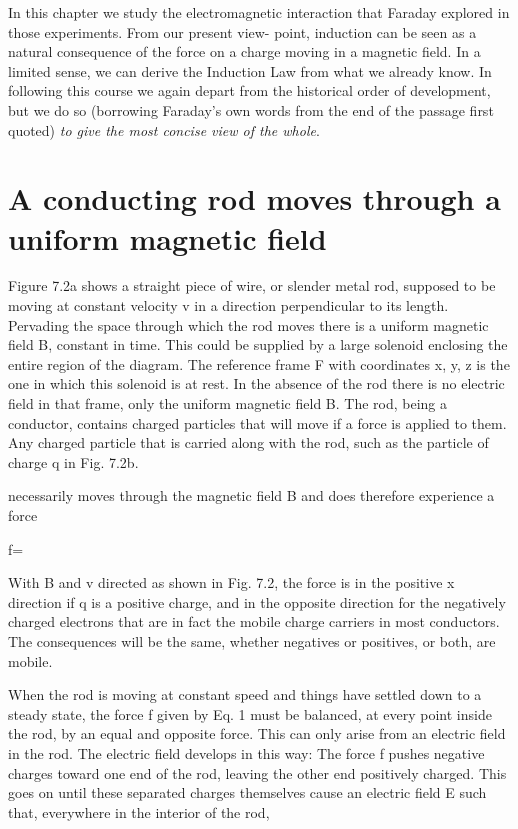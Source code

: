 In this chapter we study the electromagnetic interaction that
Faraday explored in those experiments. From our present view-
point, induction can be seen as a natural consequence of the force on
a charge moving in a magnetic field. In a limited sense, we can derive
the Induction Law from what we already know. In following this
course we again depart from the historical order of development, but
we do so (borrowing Faraday's own words from the end of the
passage first quoted) \emph{to give the most concise view of the whole}.

\iffalse

\section{A conducting rod moves through a uniform magnetic field}

Figure 7.2a shows a straight piece of wire, or slender metal rod,
supposed to be moving at constant velocity v in a direction perpendicular
to its length. Pervading the space through which the rod
moves there is a uniform magnetic field B, constant in time. This
could be supplied by a large solenoid enclosing the entire region of
the diagram. The reference frame F with coordinates x, y, z is the
one in which this solenoid is at rest. In the absence of the rod there
is no electric field in that frame, only the uniform magnetic field B.
The rod, being a conductor, contains charged particles that will
move if a force is applied to them. Any charged particle that is
carried along with the rod, such as the particle of charge q in Fig. 7.2b.

necessarily moves through the magnetic field B and does therefore
experience a force

f=%

With B and v directed as shown in Fig. 7.2, the force is in the positive
x direction if q is a positive charge, and in the opposite direction for
the negatively charged electrons that are in fact the mobile charge
carriers in most conductors. The consequences will be the same,
whether negatives or positives, or both, are mobile.

When the rod is moving at constant speed and things have settled
down to a steady state, the force f given by Eq. 1 must be balanced,
at every point inside the rod, by an equal and opposite force. This
can only arise from an electric field in the rod. The electric field
develops in this way: The force f pushes negative charges toward one
end of the rod, leaving the other end positively charged. This goes
on until these separated charges themselves cause an electric field E
such that, everywhere in the interior of the rod,

